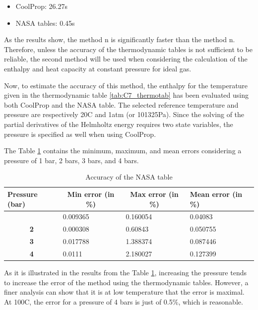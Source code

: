 \begin{itemize}
    \item CoolProp: 26.27s
    \item NASA tables: 0.45s
\end{itemize}

As the results show, the method n is significantly faster than the method n. Therefore, unless the accuracy of the thermodynamic tables is not sufficient to be reliable, the second method will be used when considering the calculation of the enthalpy and heat capacity at constant pressure for ideal gas.

Now, to estimate the accuracy of this method, the enthalpy for the temperature given in the thermodynamic table \ref{tab:C7_thermotab} has been evaluated using both CoolProp and the NASA table. The selected reference temperature and pressure are respectively 20\degree C and 1atm (or 101325Pa). Since the solving of the partial derivatives of the Helmholtz energy requires two state variables, the pressure is specified as well when using CoolProp. 

The Table \ref{tab:C7_acc_table} contains the minimum, maximum, and mean errors considering a pressure of 1 bar, 2 bars, 3 bars, and 4 bars.
\begin{longtable}[c]{@{}clll@{}}
\caption{Accuracy of the NASA table }
\label{tab:C7_acc_table}\\
\toprule
\multicolumn{1}{l}{\textbf{Pressure (bar)}} & \multicolumn{1}{c}{\textbf{Min error (in \%)}} & \multicolumn{1}{c}{\textbf{Max error (in \%)}} & \textbf{Mean error (in \%)} \\* \midrule
\endfirsthead
%
\endhead
%
\bottomrule
\endfoot
%
\endlastfoot
%
\multicolumn{1}{c}{\textbf{1}}                                  & 0.009365                                       & 0.160054                                       & 0.04083                     \\
\multicolumn{1}{c}{\textbf{2}}                                  & 0.000308                                       & 0.60843                                        & 0.050755                    \\
\multicolumn{1}{c}{\textbf{3}}                                  & 0.017788                                       & 1.388374                                       & 0.087446                    \\
\multicolumn{1}{c}{\textbf{4}}                                  & 0.0111                                         & 2.180027                                       & 0.127399                    \\* \bottomrule
\end{longtable}
As it is illustrated in the results from the Table \ref{tab:C7_acc_table}, increasing the pressure tends to increase the error of the method using the thermodynamic tables. However, a finer analysis can show that it is at low temperature that the error is maximal. At 100\degree C, the error for a pressure of 4 bars is just of 0.5\%, which is reasonable. 

